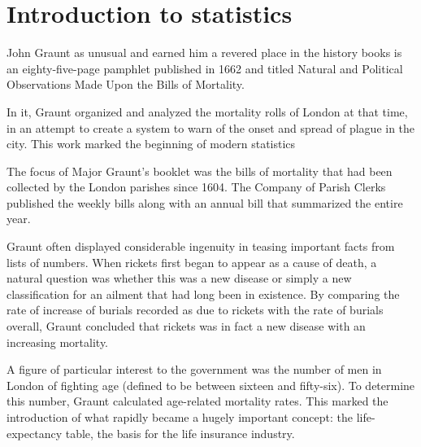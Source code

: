 \chapter{Introduction to statistics}

John Graunt as unusual and earned him a revered place in the history books is an eighty-five-page pamphlet published in 1662 and titled Natural and Political Observations Made Upon the Bills of Mortality.

In it, Graunt organized and analyzed the mortality rolls of London at that time, in an attempt to create a system to warn of the onset and spread of plague in the city. This work marked the beginning of modern statistics

The focus of Major Graunt’s booklet was the bills of mortality that had been collected by the London parishes since 1604. The Company of Parish Clerks published the weekly bills along with an annual bill that summarized the entire year.

Graunt often displayed considerable ingenuity in teasing important facts from lists of numbers. When rickets first began to appear as a cause of death, a natural question was whether this was a new disease or simply a new classification for an ailment that had long been in existence. By comparing the rate of increase of burials recorded as due to rickets with the rate of burials overall, Graunt concluded that rickets was in fact a new disease with an increasing mortality.

A figure of particular interest to the government was the number of men in London of fighting age (defined to be between sixteen and fifty-six). To determine this number, Graunt calculated age-related mortality rates. This marked the introduction of what rapidly became a hugely important concept: the life-expectancy table, the basis for the life insurance industry.

